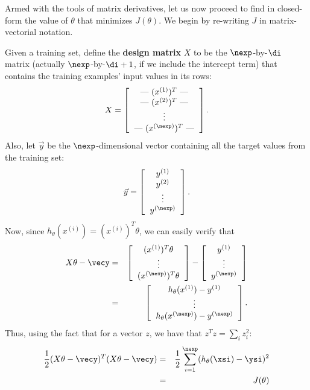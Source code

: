 \documentclass{article}
\begin{document}
Armed with the tools of matrix derivatives, let us now proceed to find
in closed-form the value of $\theta$ that minimizes $J(\theta)$.  We begin
by re-writing $J$ in matrix-vectorial notation.

Given a training set, define the {\bf design matrix} $X$ to be the
$\nexp$-by-$\di$ matrix (actually $\nexp$-by-$\di+1$, if we include the intercept term)
that contains the training examples' input values in its rows:
\[
X = \left[ \begin{tabular}{c}
--- $(x^{(1)})^T$ --- \\
--- $(x^{(2)})^T$ --- \\
\vdots \\
--- $(x^{(\nexp)})^T$ ---
\end{tabular}
\right].
\]
Also, let $\vec{y}$ be the $\nexp$-dimensional vector containing all the
target values from the training set:
\[
\vec{y} = \left[ \begin{tabular}{c}
$y^{(1)}$\\
$y^{(2)}$\\
\vdots \\
$y^{(\nexp)}$\\
\end{tabular}
\right].
\]
Now, since $h_\theta(x^{(i)}) = (x^{(i)})^T\theta$, we can easily verify that
\begin{eqnarray*}
X\theta - \vecy
&=& \left[ \begin{tabular}{c} $(x^{(1)})^T \theta$ \\ \vdots \\ $(x^{(\nexp)})^T \theta$ \end{tabular} \right]
- \left[ \begin{tabular}{c} $y^{(1)}$\\ \vdots \\ $y^{(\nexp)}$\\ \end{tabular} \right]  \\
&=& \left[ \begin{tabular}{c}
$h_\theta(x^{(1)}) - y^{(1)} $ \\
\vdots \\
$h_\theta(x^{(\nexp)}) - y^{(\nexp)} $
\end{tabular}
\right].
\end{eqnarray*}
Thus, using the fact that for a vector $z$, we have that $z^Tz = \sum_i z_i^2$:
\begin{eqnarray*}
\frac{1}{2} (X\theta - \vecy)^T (X\theta - \vecy) &=&
\frac{1}{2} \sum_{i=1}^\nexp (h_\theta(\xsi) - \ysi)^2 \\
&=& J(\theta)
\end{eqnarray*}
\end{document}
